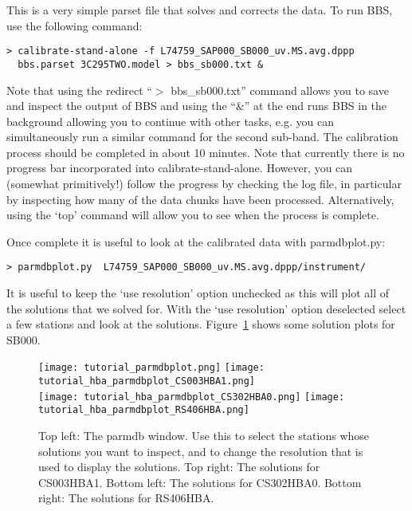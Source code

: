 This is a very simple parset file that solves and corrects the data. To run BBS, use the following command:
\begin{verbatim}
> calibrate-stand-alone -f L74759_SAP000_SB000_uv.MS.avg.dppp 
  bbs.parset 3C295TWO.model > bbs_sb000.txt &
\end{verbatim}
Note that using the  redirect ``$>$ bbs\_sb000.txt'' command allows you to save and inspect the output of BBS and using the ``\&'' at the end runs BBS in the background allowing you to continue with other tasks, e.g. you can simultaneously run a similar command for the second sub-band. The calibration process should be completed in about 10 minutes. 
Note that currently there is no progress bar incorporated into
calibrate-stand-alone. However, you can (somewhat primitively!) follow the
progress by checking the log file, in particular by inspecting how many of the
data chunks have been processed.  Alternatively, using the `top' command will 
allow you to see when the process is complete.


Once complete it is useful to look at the calibrated data with  parmdbplot.py:
\begin{verbatim}
> parmdbplot.py  L74759_SAP000_SB000_uv.MS.avg.dppp/instrument/
\end{verbatim}
It is useful to keep the `use resolution' option unchecked as this will plot all of the solutions that we solved for.
With the `use resolution' option deselected select a few stations and look at the solutions. 
Figure~\ref{fig:parmdbplot} shows some solution plots for SB000.

\begin{figure}[ht]
 \centering
\texttt{[image: tutorial\_parmdbplot.png]}
\texttt{[image: tutorial\_hba\_parmdbplot\_CS003HBA1.png]}\\
\texttt{[image: tutorial\_hba\_parmdbplot\_CS302HBA0.png]}
\texttt{[image: tutorial\_hba\_parmdbplot\_RS406HBA.png]}
\caption{Top left: The parmdb window. Use this to select the stations
whose solutions you want to
inspect, and to change the resolution that is used to display the solutions. Top right: The solutions for
CS003HBA1. Bottom left: The solutions for CS302HBA0. Bottom right: The solutions for RS406HBA.}
\label{fig:parmdbplot}
\end{figure}

